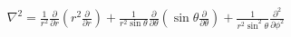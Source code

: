 \documentclass[preview]{standalone}
\begin{document}
\begin{align*}
\nabla^2 = \frac{1}{r^2} \frac{\partial}{\partial r} \left( r^2 \frac{\partial}{\partial r} \right) +\frac{1}{r^2 \sin\theta} \frac{\partial}{\partial \theta} \left( \sin\theta \frac{\partial}{\partial \theta} \right) +\frac{1}{r^2 \sin^2\theta} \frac{\partial^2}{\partial \phi^2}
\end{align*}
\end{document}
